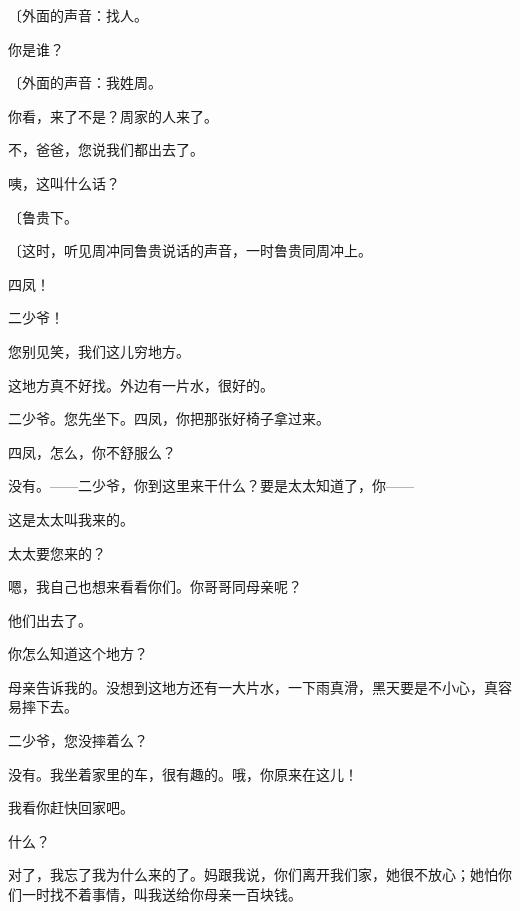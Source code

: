 {\fangsong〔外面的声音：找人。}

你是谁？

{\fangsong〔外面的声音：我姓周。}

你看，来了不是？周家的人来了。

不，爸爸，您说我们都出去了。

咦，这叫什么话？

{\fangsong〔鲁贵下。}


{\fangsong〔这时，听见周冲同鲁贵说话的声音，一时鲁贵同周冲上。}

四凤！

二少爷！

您别见笑，我们这儿穷地方。

这地方真不好找。外边有一片水，很好的。

二少爷。您先坐下。四凤，你把那张好椅子拿过来。

四凤，怎么，你不舒服么？

没有。——二少爷，你到这里来干什么？要是太太知道了，你——

这是太太叫我来的。

太太要您来的？

嗯，我自己也想来看看你们。你哥哥同母亲呢？

他们出去了。

你怎么知道这个地方？

母亲告诉我的。没想到这地方还有一大片水，一下雨真滑，黑天要是不小心，真容易摔下去。

二少爷，您没摔着么？

没有。我坐着家里的车，很有趣的。哦，你原来在这儿！

我看你赶快回家吧。

什么？

对了，我忘了我为什么来的了。妈跟我说，你们离开我们家，她很不放心；她怕你们一时找不着事情，叫我送给你母亲一百块钱。

